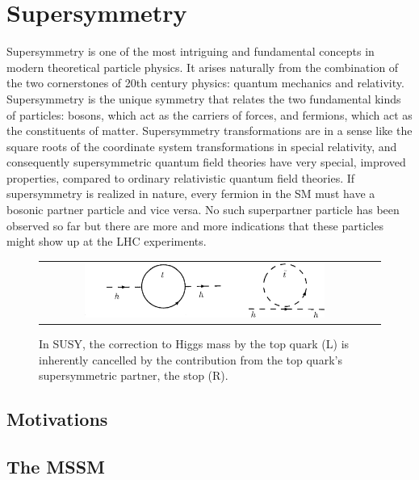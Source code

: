 \section{Supersymmetry}

Supersymmetry is one of the most intriguing and fundamental concepts in modern theoretical particle physics. It arises naturally from the combination of the two cornerstones of 20th century physics: quantum mechanics and relativity. Supersymmetry is the unique symmetry that relates the two fundamental kinds of particles: bosons, which act as the carriers of forces, and fermions, which act as the constituents of matter. Supersymmetry transformations are in a sense like the square roots of the coordinate system transformations in special relativity, and consequently supersymmetric quantum field theories have very special, improved properties, compared to ordinary relativistic quantum field theories. If supersymmetry is realized in nature, every fermion in the SM must have a bosonic partner particle and vice versa. No such superpartner particle has been observed so far but there are more and more indications that these particles might show up at the LHC experiments.


\begin{figure}[tbh!]
	\centering
	\begin{tabular}{cc}
		\includegraphics[width=0.75\textwidth]{theory/pics/higgs_loop.png}
	\end{tabular}
	\caption{In SUSY, the correction to Higgs mass by the top quark (L) is inherently cancelled by the contribution from the top quark's supersymmetric partner, the stop (R).}
	\label{fig:higgs_loop}
\end{figure}

\subsection{Motivations}

\subsection{The MSSM}

